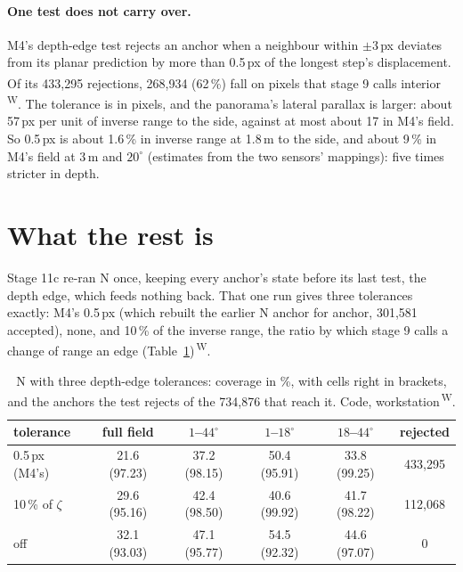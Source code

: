 \documentclass[11pt,a4paper]{article}
\newcommand{\src}[1]{\textsuperscript{\,#1}}
\newcommand{\WS}{\src{W}}   %
\begin{document}
\paragraph{One test does not carry over.} M4's depth-edge test rejects an anchor when a neighbour within $\pm3$\,px
deviates from its planar prediction by more than 0.5\,px of the longest step's displacement. Of its 433,295 rejections,
268,934 (62\,\%) fall on pixels that stage 9 calls interior\WS. The tolerance is in pixels, and the panorama's lateral
parallax is larger: about 57\,px per unit of inverse range to the side, against at most about 17 in M4's field. So
0.5\,px is about 1.6\,\% in inverse range at 1.8\,m to the side, and about 9\,\% in M4's field at 3\,m and $20^\circ$
(estimates from the two sensors' mappings): five times stricter in depth.

\section{What the rest is}\label{sec:diagnosis}

Stage 11c re-ran N once, keeping every anchor's state before its last test, the depth edge, which feeds nothing back. That
one run gives three tolerances exactly: M4's 0.5\,px (which rebuilt the earlier N anchor for anchor, 301,581 accepted),
none, and 10\,\% of the inverse range, the ratio by which stage 9 calls a change of range an edge
(Table~\ref{tab:edge})\WS.

\begin{table}[h]
\centering\small
\begin{tabular}{@{}lccccc@{}}
\toprule
tolerance & full field & $1$--$44^\circ$ & $1$--$18^\circ$ & $18$--$44^\circ$ & rejected\\
\midrule
0.5\,px (M4's) & 21.6 (97.23) & 37.2 (98.15) & 50.4 (95.91) & 33.8 (99.25) & 433,295\\
10\,\% of $\zeta$ & 29.6 (95.16) & 42.4 (98.50) & 40.6 (99.92) & 41.7 (98.22) & 112,068\\
off & 32.1 (93.03) & 47.1 (95.77) & 54.5 (92.32) & 44.6 (97.07) & 0\\
\bottomrule
\end{tabular}
\caption{N with three depth-edge tolerances: coverage in \%, with cells right in brackets, and the anchors the test
rejects of the 734,876 that reach it. Code, workstation\WS.}\label{tab:edge}
\end{table}
\end{document}
